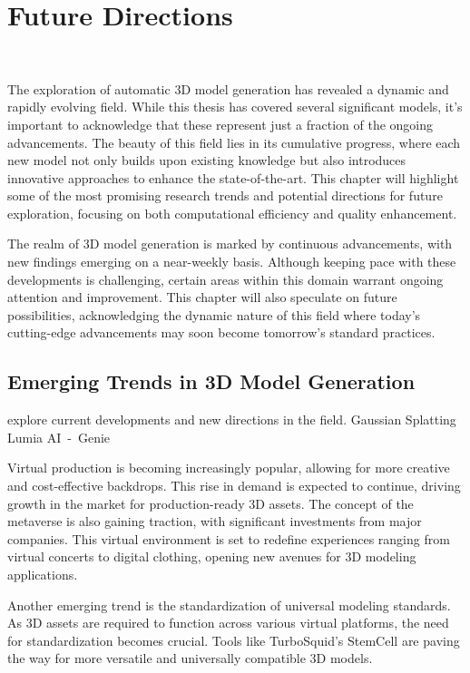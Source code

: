 \chapter{Future Directions}~\label{ch:future}

The exploration of automatic 3D model generation has revealed a dynamic and rapidly evolving field. While this thesis has covered several significant models, it's important to acknowledge that these represent just a fraction of the ongoing advancements. The beauty of this field lies in its cumulative progress, where each new model not only builds upon existing knowledge but also introduces innovative approaches to enhance the state-of-the-art. This chapter will highlight some of the most promising research trends and potential directions for future exploration, focusing on both computational efficiency and quality enhancement.

The realm of 3D model generation is marked by continuous advancements, with new findings emerging on a near-weekly basis. Although keeping pace with these developments is challenging, certain areas within this domain warrant ongoing attention and improvement. This chapter will also speculate on future possibilities, acknowledging the dynamic nature of this field where today's cutting-edge advancements may soon become tomorrow's standard practices.


\section{Emerging Trends in 3D Model Generation}
explore current developments and new directions in the field.
Gaussian Splatting
Lumia AI~-~Genie


Virtual production is becoming increasingly popular, allowing for more creative and cost-effective backdrops. This rise in demand is expected to continue, driving growth in the market for production-ready 3D assets. The concept of the metaverse is also gaining traction, with significant investments from major companies. This virtual environment is set to redefine experiences ranging from virtual concerts to digital clothing, opening new avenues for 3D modeling applications.

Another emerging trend is the standardization of universal modeling standards. As 3D assets are required to function across various virtual platforms, the need for standardization becomes crucial. Tools like TurboSquid's StemCell are paving the way for more versatile and universally compatible 3D models.

